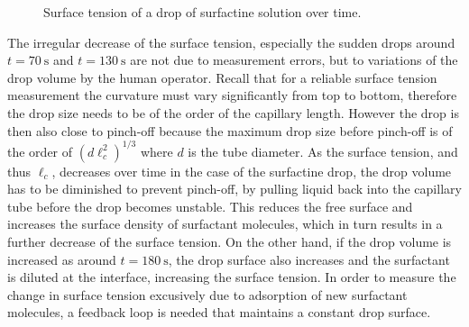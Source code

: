 \documentclass[fleqn]{scrartcl}
\begin{document}
\begin{figure}
  \centering
{}

\caption{Surface tension of a drop of surfactine solution over time.}
\label{fig:surfactine}
\end{figure}

The irregular decrease of the surface tension, especially the sudden
drops around $t=\SI{70}{\second}$ and $t=\SI{130}{\second}$ are not
due to measurement errors, but to variations of the drop volume by the
human operator. Recall that for a reliable surface tension measurement
the curvature must vary significantly from top to bottom, therefore
the drop size needs to be of the order of the capillary length.
However the drop is then also close to pinch-off because the maximum
drop size before pinch-off is of the order of $(d\ell_c^2)^{1/3}$
where $d$ is the tube diameter. As the surface tension, and thus
$\ell_c$, decreases over time in the case of the surfactine drop, the
drop volume has to be diminished to prevent pinch-off, by pulling
liquid back into the capillary tube before the drop becomes unstable.
This reduces the free surface and increases the surface density of
surfactant molecules, which in turn results in a further decrease of
the surface tension. On the other hand, if the drop volume is
increased as around $t=\SI{180}{\second}$, the drop surface also
increases and the surfactant is diluted at the interface, increasing
the surface tension. In order to measure the change in surface tension
excusively due to adsorption of new surfactant molecules, a feedback
loop is needed that maintains a constant drop surface.
\end{document}
